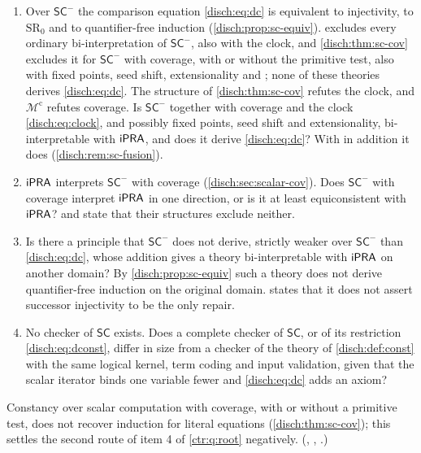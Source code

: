 \begin{question}
\label{disch:q:sc}
\begin{enumerate}
\item Over $\mathsf{SC}^{-}$ the comparison equation \eqref{disch:eq:dc} is
 equivalent to injectivity, to $\mathrm{SR}_0$ and to quantifier-free
 induction (\cref{disch:prop:sc-equiv}).  excludes
 every ordinary bi-interpretation of $\mathsf{SC}^{-}$, also with the clock,
 and \cref{disch:thm:sc-cov} excludes it for $\mathsf{SC}^{-}$ with coverage,
 with or without the primitive test, also with fixed points, seed shift,
 extensionality and ; none of these theories derives
 \eqref{disch:eq:dc}. The structure of \cref{disch:thm:sc-cov} refutes the
 clock, and $\mathcal M^{\mathrm c}$ refutes coverage. Is $\mathsf{SC}^{-}$
 together with coverage and the clock \eqref{disch:eq:clock}, and possibly
 fixed points, seed shift and extensionality, bi-interpretable with
 $\mathsf{iPRA}$, and does it derive \eqref{disch:eq:dc}? With  in
 addition it does (\cref{disch:rem:sc-fusion}).
\item $\mathsf{iPRA}$ interprets $\mathsf{SC}^{-}$ with coverage
 (\cref{disch:sec:scalar-cov}). Does $\mathsf{SC}^{-}$ with coverage
 interpret $\mathsf{iPRA}$ in one direction, or is it at least equiconsistent with
 $\mathsf{iPRA}$?  and  state
 that their structures exclude neither.
\item Is there a principle that $\mathsf{SC}^{-}$ does not derive, strictly
 weaker over $\mathsf{SC}^{-}$ than \eqref{disch:eq:dc}, whose addition gives
 a theory bi-interpretable with $\mathsf{iPRA}$ on another domain? By
 \cref{disch:prop:sc-equiv} such a theory does not derive quantifier-free
 induction on the original domain.  states that it
 does not assert successor injectivity to be the only repair.
\item No checker of $\mathsf{SC}$ exists. Does a complete checker of
 $\mathsf{SC}$, or of its restriction \eqref{disch:eq:dconst}, differ in size
 from a checker of the theory of \cref{disch:def:const} with the same
 logical kernel, term coding and input validation, given that the scalar
 iterator binds one variable fewer and \eqref{disch:eq:dc} adds an axiom?
\end{enumerate}
Constancy over scalar computation with coverage, with or without a primitive
test, does not recover induction for literal equations
(\cref{disch:thm:sc-cov}); this settles the second route of item 4 of
\cref{ctr:q:root} negatively. (,
, .)
\end{question}

